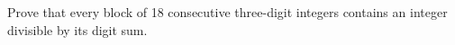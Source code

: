 Prove that every block of 18 consecutive three-digit integers contains an integer divisible by its digit sum.
